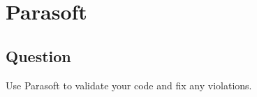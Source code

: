 \section{Parasoft}
    \subsection*{Question}
        Use Parasoft to validate your code and fix any violations.